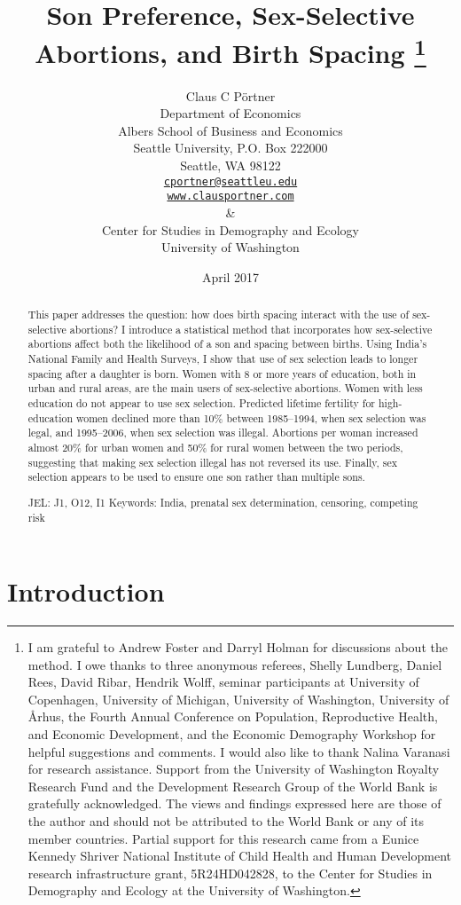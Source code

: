 \documentclass[12pt,letterpaper]{article}
\title{Son Preference, Sex-Selective Abortions, and Birth Spacing
\protect\thanks{%
I am grateful to Andrew Foster and Darryl Holman for discussions about the method.
I owe thanks to three anonymous referees, Shelly Lundberg, Daniel Rees, David Ribar, 
Hendrik Wolff, seminar participants at University of Copenhagen, University of Michigan, 
University of Washington, University of \AA{}rhus, the Fourth 
Annual Conference on Population, Reproductive Health, 
and Economic Development, and the Economic Demography Workshop for helpful suggestions and comments.
I would also like to thank Nalina Varanasi for research assistance.
Support from the University of Washington Royalty Research Fund and the 
Development Research Group of the World Bank is gratefully acknowledged.
The views and findings expressed here are those of the author and
should not be attributed to the World Bank or any of its member countries.
Partial support for this research came from a Eunice Kennedy Shriver National
Institute of Child Health and Human Development research infrastructure grant,
5R24HD042828, to the Center for Studies in Demography and Ecology at the
University of Washington.
}
}
\author{}
\author{Claus C P\"ortner\\
    Department of Economics\\
    Albers School of Business and Economics\\
    Seattle University, P.O. Box 222000\\
    Seattle, WA 98122\\
    \href{mailto:cportner@seattleu.edu}{\texttt{cportner@seattleu.edu}}\\
    \href{http://www.clausportner.com}{\texttt{www.clausportner.com}}\\
    \& \\
    Center for Studies in Demography and Ecology \\
    University of Washington\\ \vspace{2cm}
    }
\date{April 2017}
\begin{document}
\graphicspath{{figures/}}

\setcounter{page}{-1}
\maketitle
\thispagestyle{empty}

\newpage

\doublespacing


 
\maketitle
\thispagestyle{empty}


\newpage
\doublespacing


\begin{abstract}

\noindent This paper addresses the question:
how does birth spacing interact with the use of sex-selective abortions? 
I introduce a statistical method that incorporates how sex-selective abortions 
affect both the likelihood of a son and spacing between births.
Using India's National Family and Health Surveys,
I show that use of sex selection leads to longer spacing after a daughter is born.
Women with 8 or more years of education, both in urban and rural areas, are the main users 
of sex-selective abortions.
Women with less education do not appear to use sex selection.
Predicted lifetime fertility for high-education women declined more than 10\% 
between 1985--1994, when sex selection was legal, and 1995--2006, when sex selection was illegal.
Abortions per woman increased almost 20\% for urban women and 50\%
for rural women between the two periods, suggesting that making sex selection illegal has 
not reversed its use.
Finally, sex selection appears to be used to ensure one son rather than multiple sons.

\noindent JEL: J1, O12, I1
\noindent Keywords: India, prenatal sex determination, censoring, competing risk
\end{abstract}

\newpage



\section{Introduction\label{sec:intro}}
\end{document}
